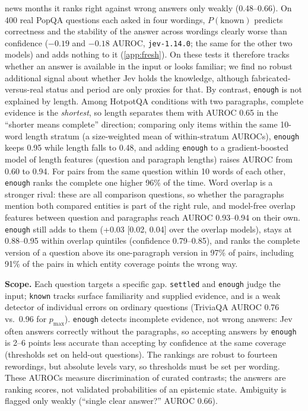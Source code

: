 \documentclass[10pt,twocolumn]{article}
\newcommand{\pmax}{p_{\max}}
\begin{document}
news months it ranks right against wrong answers only weakly (0.48--0.66).
On 400 real PopQA questions each asked in four wordings, $P(\text{known})$
predicts correctness and the stability of the answer across wordings clearly
worse than confidence ($-0.19$ and $-0.18$ AUROC, \texttt{jev-1.14.0}; the
same for the other two models) and adds nothing to it (\cref{app:fresh}). On
these tests it therefore tracks whether an answer is available in the input or
looks familiar; we find no robust additional signal about whether Jev holds
the knowledge, although fabricated-versus-real status and period are only
proxies for that. By contrast, \texttt{enough} is not explained by length.
Among HotpotQA conditions with two paragraphs, complete evidence is the
\emph{shortest}, so length separates them with AUROC 0.65 in the ``shorter means
complete'' direction; comparing only items within the same 10-word length
stratum (a size-weighted mean of within-stratum AUROCs), \texttt{enough} keeps 0.95
while length falls to 0.48, and adding \texttt{enough} to a gradient-boosted
model of length features (question and paragraph lengths) raises AUROC from
0.60 to 0.94. For pairs from the same question within 10 words of each other,
\texttt{enough} ranks the complete one higher 96\% of the time. Word overlap is
a stronger rival: these are all comparison questions, so whether the
paragraphs mention both compared entities is part of the right rule, and
model-free overlap features between question and paragraphs reach AUROC
0.93--0.94 on their own. \texttt{enough} still adds to them (+0.03 [0.02,
0.04] over the overlap models), stays at 0.88--0.95 within overlap quintiles
(confidence 0.79--0.85), and ranks the complete version of a question above
its one-paragraph version in 97\% of pairs, including 91\% of the pairs in
which entity coverage points the wrong way.

\textbf{Scope.} Each question targets a specific gap. \texttt{settled} and
\texttt{enough} judge the input; \texttt{known} tracks surface familiarity and
supplied evidence, and is a weak detector of individual errors on ordinary
questions (TriviaQA AUROC 0.76 vs.\ 0.96 for $\pmax$). \texttt{enough} detects
incomplete evidence, not wrong answers: Jev often answers correctly without
the paragraphs, so accepting answers by \texttt{enough} is 2--6 points less
accurate than accepting by confidence at the same coverage (thresholds set on
held-out questions). The
rankings are robust to fourteen rewordings, but absolute levels vary, so
thresholds must be set per wording. These AUROCs measure discrimination of
curated contrasts; the answers are ranking scores, not validated probabilities
of an epistemic state. Ambiguity is flagged only weakly
(``single clear answer?'' AUROC 0.66).
\end{document}
